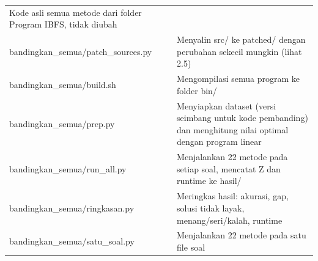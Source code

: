 \documentclass[10pt,a4paper]{article}
\begin{document}
{\begin{longtable}[]{@{}
  >{\raggedright\arraybackslash}p{}
  >{\raggedright\arraybackslash}p{}@{}}
\begin{minipage}[b]{\linewidth}
Kode asli semua metode dari folder Program IBFS, tidak diubah
\end{minipage} \\
\begin{minipage}[b]{\linewidth}\raggedright
bandingkan\_semua/patch\_sources.py
\end{minipage} & \begin{minipage}[b]{\linewidth}\centering
Menyalin src/ ke patched/ dengan perubahan sekecil mungkin (lihat 2.5)
\end{minipage} \\
\begin{minipage}[b]{\linewidth}\raggedright
bandingkan\_semua/build.sh
\end{minipage} & \begin{minipage}[b]{\linewidth}\centering
Mengompilasi semua program ke folder bin/
\end{minipage} \\
\begin{minipage}[b]{\linewidth}\raggedright
bandingkan\_semua/prep.py
\end{minipage} & \begin{minipage}[b]{\linewidth}\centering
Menyiapkan dataset (versi seimbang untuk kode pembanding) dan menghitung
nilai optimal dengan program linear
\end{minipage} \\
\begin{minipage}[b]{\linewidth}\raggedright
bandingkan\_semua/run\_all.py
\end{minipage} & \begin{minipage}[b]{\linewidth}\centering
Menjalankan 22 metode pada setiap soal, mencatat Z dan runtime ke hasil/
\end{minipage} \\
\begin{minipage}[b]{\linewidth}\raggedright
bandingkan\_semua/ringkasan.py
\end{minipage} & \begin{minipage}[b]{\linewidth}\centering
Meringkas hasil: akurasi, gap, solusi tidak layak, menang/seri/kalah,
runtime
\end{minipage} \\
\begin{minipage}[b]{\linewidth}\raggedright
bandingkan\_semua/satu\_soal.py
\end{minipage} & \begin{minipage}[b]{\linewidth}\centering
Menjalankan 22 metode pada satu file soal
\end{minipage} \\

\end{longtable}}
\end{document}
